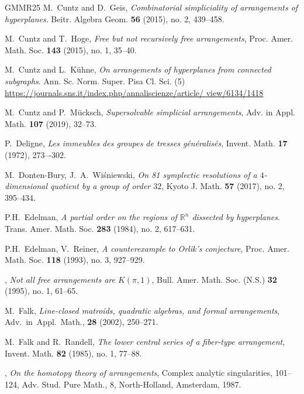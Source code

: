 \documentclass[12pt]{amsart}
\newcommand\BBR{{\mathbb R}}
\numberwithin{equation}{section}
\theoremstyle{plain}
\theoremstyle{definition}
\begin{document}
\begin{thebibliography}{GMMR25}
M.~Cuntz and D.~Geis, 
\emph{Combinatorial simpliciality of arrangements of hyperplanes}. Beitr. Algebra Geom. \textbf{56} (2015), no. 2, 439--458. 

M.~Cuntz and T.~Hoge, 
\emph{Free but not recursively free arrangements},
Proc. Amer. Math. Soc. \textbf{143} (2015), no. 1, 35--40.

	M.~Cuntz and L.~Kühne, 
	\emph{On arrangements of hyperplanes from connected subgraphs}. Ann. Sc. Norm. Super. Pisa Cl. Sci. (5)  
 \url{https://journals.sns.it/index.php/annaliscienze/article/
view/6134/1418}

M.~Cuntz and P.~M\"ucksch, 
\emph{Supersolvable simplicial arrangements},
Adv. in Appl. Math. \textbf{107} (2019), 32--73.

P.~Deligne,
\emph{Les immeubles des groupes de tresses g\'en\'eralis\'es},
Invent. Math. \textbf{17} (1972), 273–-302.

 M.~Donten-Bury, J.~A.~Wi\'sniewski, \emph{On 81 symplectic resolutions of a $4$-dimensional quotient by a group of order $32$}, Kyoto J. Math. \textbf{57} (2017), no. 2, 395--434.

P.H.~Edelman, 
\emph{A partial order on the regions of $\BBR^n$ 
	dissected by hyperplanes}. Trans. Amer. Math. Soc. \textbf{283} (1984), no. 2, 617--631. 

P.H.~Edelman, V.~Reiner, 
\emph{A counterexample to Orlik's conjecture},
Proc. Amer. Math. Soc. \textbf{118} (1993), no. 3, 927--929.

\bysame,  %
\emph{Not all free arrangements are $K(\pi,1)$},
Bull. Amer. Math. Soc. (N.S.) \textbf{32} (1995), no. 1, 61--65.

M.~Falk,
\emph{Line-closed matroids, quadratic algebras, and formal arrangements},
Adv.~in~Appl.~Math., \textbf{28} (2002), 250--271.

M.~Falk and R.~Randell,
\emph{The lower central series of a fiber-type arrangement},
Invent. Math. \textbf{82} (1985), no. 1, 77--88.

\bysame,
\emph{On the homotopy theory of arrangements},
Complex analytic singularities, 101--124,
Adv. Stud. Pure Math., 8, North-Holland, Amsterdam, 1987.


\end{thebibliography}
\end{document}
